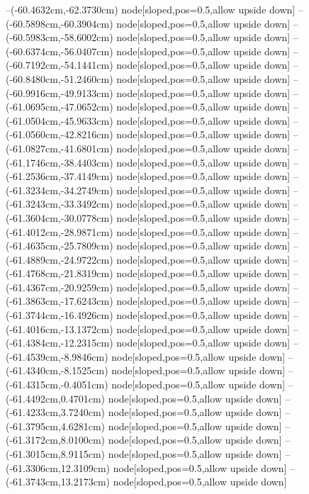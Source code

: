 --(-60.4632cm,-62.3730cm) node[sloped,pos=0.5,allow upside down]{\ArrowIn}
--(-60.5898cm,-60.3904cm) node[sloped,pos=0.5,allow upside down]{\ArrowIn}
--(-60.5983cm,-58.6002cm) node[sloped,pos=0.5,allow upside down]{\ArrowIn}
--(-60.6374cm,-56.0407cm) node[sloped,pos=0.5,allow upside down]{\ArrowIn}
--(-60.7192cm,-54.1441cm) node[sloped,pos=0.5,allow upside down]{\ArrowIn}
--(-60.8480cm,-51.2460cm) node[sloped,pos=0.5,allow upside down]{\ArrowIn}
--(-60.9916cm,-49.9133cm) node[sloped,pos=0.5,allow upside down]{\ArrowIn}
--(-61.0695cm,-47.0652cm) node[sloped,pos=0.5,allow upside down]{\ArrowIn}
--(-61.0504cm,-45.9633cm) node[sloped,pos=0.5,allow upside down]{\ArrowIn}
--(-61.0560cm,-42.8216cm) node[sloped,pos=0.5,allow upside down]{\ArrowIn}
--(-61.0827cm,-41.6801cm) node[sloped,pos=0.5,allow upside down]{\ArrowIn}
--(-61.1746cm,-38.4403cm) node[sloped,pos=0.5,allow upside down]{\ArrowIn}
--(-61.2536cm,-37.4149cm) node[sloped,pos=0.5,allow upside down]{\ArrowIn}
--(-61.3234cm,-34.2749cm) node[sloped,pos=0.5,allow upside down]{\ArrowIn}
--(-61.3243cm,-33.3492cm) node[sloped,pos=0.5,allow upside down]{\arrowIn}
--(-61.3604cm,-30.0778cm) node[sloped,pos=0.5,allow upside down]{\ArrowIn}
--(-61.4012cm,-28.9871cm) node[sloped,pos=0.5,allow upside down]{\ArrowIn}
--(-61.4635cm,-25.7809cm) node[sloped,pos=0.5,allow upside down]{\ArrowIn}
--(-61.4889cm,-24.9722cm) node[sloped,pos=0.5,allow upside down]{\arrowIn}
--(-61.4768cm,-21.8319cm) node[sloped,pos=0.5,allow upside down]{\ArrowIn}
--(-61.4367cm,-20.9259cm) node[sloped,pos=0.5,allow upside down]{\arrowIn}
--(-61.3863cm,-17.6243cm) node[sloped,pos=0.5,allow upside down]{\ArrowIn}
--(-61.3744cm,-16.4926cm) node[sloped,pos=0.5,allow upside down]{\ArrowIn}
--(-61.4016cm,-13.1372cm) node[sloped,pos=0.5,allow upside down]{\ArrowIn}
--(-61.4384cm,-12.2315cm) node[sloped,pos=0.5,allow upside down]{\arrowIn}
--(-61.4539cm,-8.9846cm) node[sloped,pos=0.5,allow upside down]{\ArrowIn}
--(-61.4340cm,-8.1525cm) node[sloped,pos=0.5,allow upside down]{\arrowIn}
--(-61.4315cm,-0.4051cm) node[sloped,pos=0.5,allow upside down]{\ArrowIn}
--(-61.4492cm,0.4701cm) node[sloped,pos=0.5,allow upside down]{\arrowIn}
--(-61.4233cm,3.7240cm) node[sloped,pos=0.5,allow upside down]{\ArrowIn}
--(-61.3795cm,4.6281cm) node[sloped,pos=0.5,allow upside down]{\arrowIn}
--(-61.3172cm,8.0100cm) node[sloped,pos=0.5,allow upside down]{\ArrowIn}
--(-61.3015cm,8.9115cm) node[sloped,pos=0.5,allow upside down]{\arrowIn}
--(-61.3306cm,12.3109cm) node[sloped,pos=0.5,allow upside down]{\ArrowIn}
--(-61.3743cm,13.2173cm) node[sloped,pos=0.5,allow upside down]{\arrowIn}
